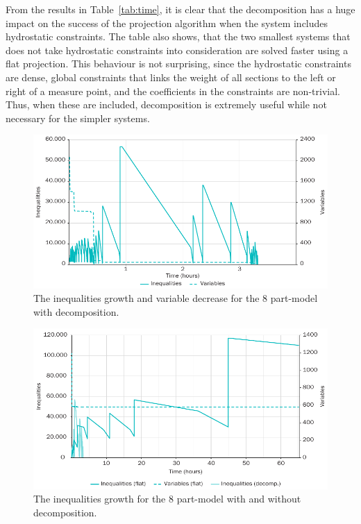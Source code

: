 From the results in Table~\ref{tab:time}, it is clear that the decomposition has a huge impact on the success of the projection algorithm when the system includes
hydrostatic constraints.
The table also shows, that the two smallest systems that does not take hydrostatic constraints into consideration are solved faster using a flat projection. This behaviour is not surprising, since the hydrostatic constraints are dense, global constraints that links the weight of all sections to the left or right of a measure point, and the coefficients in the constraints are non-trivial. Thus, when these are included, decomposition is extremely useful while not necessary for the simpler systems.
 
\begin{figure}[htbp]
	\centering
		\includegraphics{figures/decompIneqGrowth.pdf}
	\caption{The inequalities growth and variable decrease for the 8 part-model with decomposition.}
	\label{fig:8parts}
\end{figure}

\begin{figure}[htbp]
	\centering
		\includegraphics{figures/ineqGrowth.pdf}
	\caption{The inequalities growth for the 8 part-model with and without decomposition.}
	\label{fig:compare}
\end{figure}

